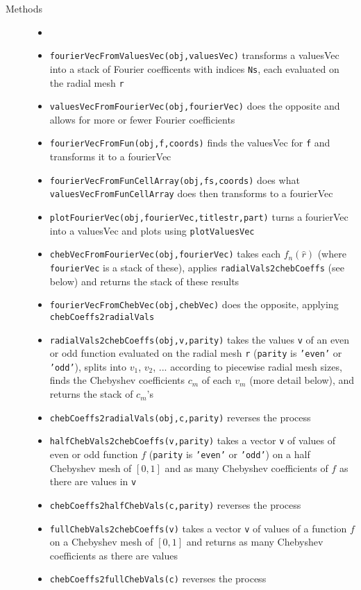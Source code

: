 \begin{description}
 \item[Methods]
   \begin{itemize}
    \item[] %
    \item {\tt fourierVecFromValuesVec(obj,valuesVec)} 
          transforms a valuesVec into a stack of Fourier
          coefficents with indices {\tt Ns}, each evaluated
          on the radial mesh {\tt r}
    \item {\tt valuesVecFromFourierVec(obj,fourierVec)}
          does the opposite and allows for more or
          fewer Fourier coefficients
    \item {\tt fourierVecFromFun(obj,f,coords)} finds the valuesVec
          for {\tt f} and transforms it to a fourierVec
    \item {\tt fourierVecFromFunCellArray(obj,fs,coords)}
          does what {\tt valuesVecFromFunCellArray} does then
          transforms to a fourierVec
    \item {\tt plotFourierVec(obj,fourierVec,titlestr,part)}
          turns a fourierVec into a valuesVec and plots using
          {\tt plotValuesVec}
    \item {\tt chebVecFromFourierVec(obj,fourierVec)} takes each
          $f_n(\hat{r})$ (where {\tt fourierVec} is a stack of these),
          applies {\tt radialVals2chebCoeffs} (see below)
          and returns the stack of these results
    \item {\tt fourierVecFromChebVec(obj,chebVec)} does the opposite,
          applying {\tt chebCoeffs2radialVals}          
    \item {\tt radialVals2chebCoeffs(obj,v,parity)} takes the values
          {\tt v} of an even or odd function evaluated on the radial mesh
          {\tt r} ({\tt parity} is {\tt 'even'} or {\tt 'odd'}), splits
          into $v_1$, $v_2$, ... according to piecewise radial mesh sizes,
          finds the Chebyshev coefficients $c_m$ of each $v_m$
          (more detail below), and returns the stack of $c_m$'s
    \item {\tt chebCoeffs2radialVals(obj,c,parity)} reverses the process
    \item {\tt halfChebVals2chebCoeffs(v,parity)} takes a vector {\tt v}
          of values of even or odd function $f$ ({\tt parity} is
          {\tt 'even'} or {\tt 'odd'}) on a half Chebyshev mesh of $[0,1]$
          and as many Chebyshev coefficients of $f$ as there are
          values in {\tt v}
    \item {\tt chebCoeffs2halfChebVals(c,parity)} reverses the process
    \item {\tt fullChebVals2chebCoeffs(v)} takes a vector {\tt v} of
          values of a function $f$ on a Chebyshev mesh of $[0,1]$ and
          returns as many Chebyshev coefficients as there are values
    \item {\tt chebCoeffs2fullChebVals(c)} reverses the process
   \end{itemize}
\end{description}

